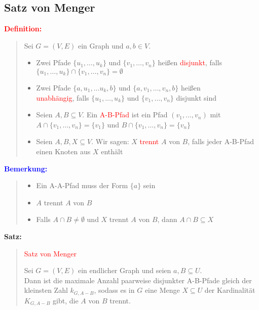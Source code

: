 \documentclass{article}
\newcommand{\red}[1]{\textcolor{red}{#1}}
\newcommand{\blue}[1]{\textcolor{blue}{#1}}
\newcommand{\dgr}[1]{\textcolor{dgr}{#1}}
\newcommand{\de}[1]{\red{\textbf{Definition: }}\begin{quote}#1\end{quote}}
\newcommand{\an}[1]{\blue{\textbf{Bemerkung: }}\begin{quote}#1\end{quote}}
\newcommand{\se}[1]{\dgr{\textbf{Satz: }}\begin{quote}#1\end{quote}}
\begin{document}
\newpage
\subsection{Satz von Menger}

\de{
    Sei $G=(V,E)$ ein Graph und $a,b \in V$.
    \begin{itemize}
        \item Zwei Pfade $\{u_1, \dots, u_k\}$ und $\{v_1, \dots, v_n\}$ heißen \red{disjunkt}, falls $\{u_1, \dots, u_k\} \cap \{v_1, \dots, v_n\} = \emptyset$
        \item Zwei Pfade $\{a, u_1, \dots u_k, b\}$ und $\{a, v_1, \dots, v_n, b\}$ heißen\\
        \red{unabhängig}, falls $\{u_1, \dots, u_k\}$ und $\{v_1, \dots, v_n\}$ disjunkt sind
        \item Seien $A, B \subseteq V$. Ein \red{A-B-Pfad} ist ein Pfad $(v_1, \dots, v_n)$ mit $A \cap \{v_1, \dots, v_n\} = \{v_1\}$ und $B \cap \{v_1, \dots, v_n\} = \{v_n\}$
        \item Seien $A,B,X \subseteq V$. Wir sagen: $X$ \red{trennt} $A$ von $B$, falls jeder A-B-Pfad einen Knoten aus $X$ enthält
    \end{itemize}
}

\an{
    \begin{itemize}
        \item Ein A-A-Pfad muss der Form $\{a\}$ sein
        \item $A$ trennt $A$ von $B$
        \item Falls $A \cap B \ne \emptyset$ und $X$ trennt $A$ von $B$, dann $A \cap B \subseteq X$
    \end{itemize}
}

\se{\red{Satz von Menger}

    Sei $G=(V,E)$ ein endlicher Graph und seien $a, B \subseteq U$.\\
    Dann ist die maximale Anzahl paarweise disjunkter A-B-Pfade gleich der kleinsten Zahl $k_{G,A-B}$, sodass es in $G$ eine Menge $X \subseteq U$ der Kardinalität $K_{G,A-B}$ gibt, die $A$ von $B$ trennt.
}
\end{document}
